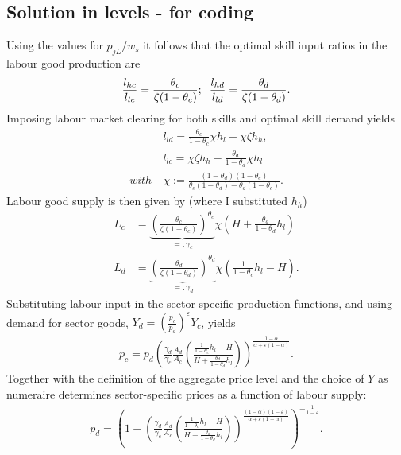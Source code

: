 \subsection{Solution in levels - for coding}
Using the values for $p_{jL}/w_s$ it follows that the optimal skill input ratios in the labour good production are
\begin{align*}
\frac{l_{hc}}{l_{lc}}=\frac{\theta_c}{\zeta (1-\theta_c)}; \hspace{2mm} \frac{l_{hd}}{l_{ld}}=\frac{\theta_d}{\zeta (1-\theta_d)}.
\end{align*}
Imposing labour market clearing for both skills and optimal skill demand  yields 
\begin{align*}
&l_{ld}=\frac{\theta_c}{1-\theta_c}\chi h_l-\chi \zeta h_h,\\
& l_{lc}=\chi \zeta h_h-\frac{\theta_d}{1-\theta_d}\chi h_l\\
with \ & \chi:= \frac{(1-\theta_d)(1-\theta_c)}{\theta_c(1-\theta_d)-\theta_d(1-\theta_c)}.
\end{align*}
Labour good supply is then given by (where I substituted $h_h$)
\begin{align}
L_c&=\underbrace{\left(\frac{\theta_c}{\zeta(1-\theta_c)}\right)^{\theta_c}}_{=:\gamma_c}\chi\left(H +\frac{\theta_d}{1-\theta_d} h_l\right)\label{eq:lab_inputc} \\
L_d&= \underbrace{\left(\frac{\theta_d}{\zeta (1-\theta_d)}\right)^{\theta_d}}_{=:\gamma_d}\chi\left(\frac{1}{1-\theta_c} h_l-H\right).\label{eq:lab_inputd}
\end{align}
Substituting labour input in the sector-specific production functions, and using demand for sector goods, $Y_d=\left(\frac{p_c}{p_d}\right)^\varepsilon Y_c$, yields
\begin{align*}
p_c =p_d\left(\frac{\gamma_d}{\gamma_c}\frac{A_d}{A_c}\left(\frac{\frac{1}{1-\theta_c}h_l-H}{H+\frac{\theta_d}{1-\theta_d}h_l}\right)\right)^{\frac{1-\alpha}{\alpha+\varepsilon(1-\alpha)}}.
\end{align*}
Together with the definition of the aggregate price level and the choice of $Y$ as numeraire determines sector-specific prices as a function of labour supply:
\begin{align*}
p_d= \left(1+\left(\frac{\gamma_d}{\gamma_c}\frac{A_d}{A_c}\left(\frac{\frac{1}{1-\theta_c}h_l-H}{H+\frac{\theta_d}{1-\theta_d}h_l}\right)\right)^{\frac{(1-\alpha)(1-\varepsilon)}{\alpha+\varepsilon(1-\alpha)}}\right)^{-\frac{1}{1-\varepsilon}}.
\end{align*}

